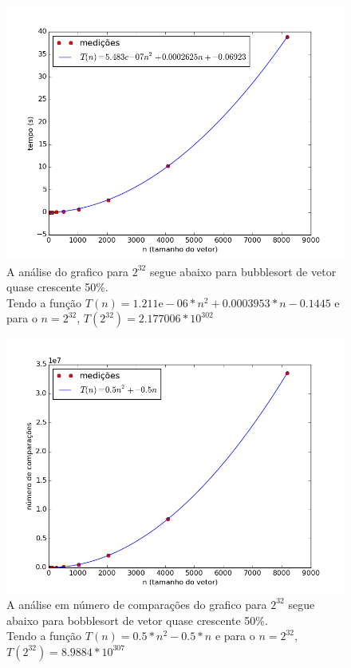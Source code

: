 \documentclass[12pt,a4paper,twoside]{report}
\begin{document}


\begin{figure}[ht]
\centering \includegraphics[scale=0.8]{../bolha/imagens/bolhaQuaseCresc500.png}
\caption{A análise do grafico para $2^{32}$ segue abaixo para bubblesort de vetor quase crescente 50\%.\\
Tendo a função $T(n) = 1.211\mathrm{e}-06*n^2+0.0003953*n-0.1445$ e para o $n =2^{32}$, $T(2^{32}) = 2.177006 * 10^{302}$}
\label{fig:bolhaQuaseCresc500}
\end{figure}

\begin{figure}[ht]
\centering \includegraphics[scale=0.8]{../bolha/imagens/bolhaQuaseCresc501.png}
\caption{A análise em número de comparações do grafico para $2^{32}$ segue abaixo para bobblesort de vetor quase crescente 50\%.\\
Tendo a função $T(n) = 0.5*n^2 - 0.5*n$ e para o $n =2^{32}$, $T(2^{32}) = 8.9884 * 10^{307}$}
\label{fig:bolhaQuaseCresc501}
\end{figure}
\end{document}
